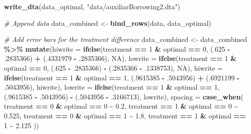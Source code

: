 \documentclass[
]{article}
\newenvironment{Shaded}{\begin{snugshade}}{\end{snugshade}}
\newcommand{\AttributeTok}[1]{\textcolor[rgb]{0.13,0.29,0.53}{#1}}
\newcommand{\CommentTok}[1]{\textcolor[rgb]{0.56,0.35,0.01}{\textit{#1}}}
\newcommand{\ConstantTok}[1]{\textcolor[rgb]{0.56,0.35,0.01}{#1}}
\newcommand{\DecValTok}[1]{\textcolor[rgb]{0.00,0.00,0.81}{#1}}
\newcommand{\FloatTok}[1]{\textcolor[rgb]{0.00,0.00,0.81}{#1}}
\newcommand{\FunctionTok}[1]{\textcolor[rgb]{0.13,0.29,0.53}{\textbf{#1}}}
\newcommand{\NormalTok}[1]{#1}
\newcommand{\OtherTok}[1]{\textcolor[rgb]{0.56,0.35,0.01}{#1}}
\newcommand{\SpecialCharTok}[1]{\textcolor[rgb]{0.81,0.36,0.00}{\textbf{#1}}}
\newcommand{\StringTok}[1]{\textcolor[rgb]{0.31,0.60,0.02}{#1}}
\begin{document}
\begin{Shaded}
\begin{Highlighting}[]
\FunctionTok{write\_dta}\NormalTok{(data\_optimal, }\StringTok{"data/auxiliarBorrowing2.dta"}\NormalTok{)}

\CommentTok{\# Append data}
\NormalTok{data\_combined }\OtherTok{\textless{}{-}} \FunctionTok{bind\_rows}\NormalTok{(data, data\_optimal)}

\CommentTok{\# Add error bars for the treatment difference}
\NormalTok{data\_combined }\OtherTok{\textless{}{-}}\NormalTok{ data\_combined }\SpecialCharTok{\%\textgreater{}\%}
  \FunctionTok{mutate}\NormalTok{(}\AttributeTok{hiwrite =} \FunctionTok{ifelse}\NormalTok{(treatment }\SpecialCharTok{==} \DecValTok{1} \SpecialCharTok{\&}\NormalTok{ optimal }\SpecialCharTok{==} \DecValTok{0}\NormalTok{, (.}\DecValTok{625} \SpecialCharTok{{-}}\NormalTok{ .}\DecValTok{2835366}\NormalTok{) }\SpecialCharTok{+}\NormalTok{ (.}\DecValTok{4331979} \SpecialCharTok{{-}}\NormalTok{ .}\DecValTok{2835366}\NormalTok{), }\ConstantTok{NA}\NormalTok{),}
         \AttributeTok{lowrite =} \FunctionTok{ifelse}\NormalTok{(treatment }\SpecialCharTok{==} \DecValTok{1} \SpecialCharTok{\&}\NormalTok{ optimal }\SpecialCharTok{==} \DecValTok{0}\NormalTok{, (.}\DecValTok{625} \SpecialCharTok{{-}}\NormalTok{ .}\DecValTok{2835366}\NormalTok{) }\SpecialCharTok{{-}}\NormalTok{ (.}\DecValTok{2835366} \SpecialCharTok{{-}}\NormalTok{ .}\DecValTok{1338753}\NormalTok{), }\ConstantTok{NA}\NormalTok{),}
         \AttributeTok{hiwrite =} \FunctionTok{ifelse}\NormalTok{(treatment }\SpecialCharTok{==} \DecValTok{1} \SpecialCharTok{\&}\NormalTok{ optimal }\SpecialCharTok{==} \DecValTok{1}\NormalTok{, (.}\DecValTok{9615385} \SpecialCharTok{{-}}\NormalTok{ .}\DecValTok{5043956}\NormalTok{) }\SpecialCharTok{+}\NormalTok{ (.}\DecValTok{6921199} \SpecialCharTok{{-}}\NormalTok{ .}\DecValTok{5043956}\NormalTok{), hiwrite),}
         \AttributeTok{lowrite =} \FunctionTok{ifelse}\NormalTok{(treatment }\SpecialCharTok{==} \DecValTok{1} \SpecialCharTok{\&}\NormalTok{ optimal }\SpecialCharTok{==} \DecValTok{1}\NormalTok{, (.}\DecValTok{9615385} \SpecialCharTok{{-}}\NormalTok{ .}\DecValTok{5043956}\NormalTok{) }\SpecialCharTok{{-}}\NormalTok{ (.}\DecValTok{5043956} \SpecialCharTok{{-}}\NormalTok{ .}\DecValTok{3166713}\NormalTok{), lowrite),}
         \AttributeTok{spacing =} \FunctionTok{case\_when}\NormalTok{(}
\NormalTok{           treatment }\SpecialCharTok{==} \DecValTok{0} \SpecialCharTok{\&}\NormalTok{ optimal }\SpecialCharTok{==} \DecValTok{0} \SpecialCharTok{\textasciitilde{}} \FloatTok{0.2}\NormalTok{,}
\NormalTok{           treatment }\SpecialCharTok{==} \DecValTok{1} \SpecialCharTok{\&}\NormalTok{ optimal }\SpecialCharTok{==} \DecValTok{0} \SpecialCharTok{\textasciitilde{}} \FloatTok{0.525}\NormalTok{,}
\NormalTok{           treatment }\SpecialCharTok{==} \DecValTok{0} \SpecialCharTok{\&}\NormalTok{ optimal }\SpecialCharTok{==} \DecValTok{1} \SpecialCharTok{\textasciitilde{}} \FloatTok{1.8}\NormalTok{,}
\NormalTok{           treatment }\SpecialCharTok{==} \DecValTok{1} \SpecialCharTok{\&}\NormalTok{ optimal }\SpecialCharTok{==} \DecValTok{1} \SpecialCharTok{\textasciitilde{}} \FloatTok{2.125}
\NormalTok{         ))}


\end{Highlighting}
\end{Shaded}
\end{document}
